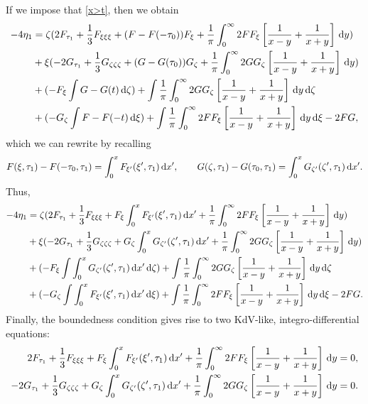 \documentclass[10pt,reqno,oneside,a4paper, landscape]{article}
\begin{document}
If we impose that \eqref{x>t}, then we obtain 
\begin{equation*}
\begin{aligned}
- 4\eta_{1} &=  \zeta(2F_{\tau_1} + \frac{1}{3}F_{\xi\xi\xi} + (F- F(-\tau_0))F_\xi +  \frac{1}{\pi} \int_0^\infty 2FF_\xi \left[ \frac{1}{x-y} + \frac{1}{x+y} \right] \,\mathrm{d} y) \\
&+ \xi(- 2G_{\tau_1} +  \frac{1}{3} G_{\zeta\zeta\zeta}+ (G - G(\tau_0))G_\zeta + \frac{1}{\pi} \int_0^\infty 2GG_\zeta \left[ \frac{1}{x-y} + \frac{1}{x+y} \right] \,\mathrm{d} y) \\
&+ (- F_{\xi} \int G -G(t) \,\mathrm{d} \zeta) + \int \frac{1}{\pi} \int_0^\infty 2GG_\zeta \left[ \frac{1}{x-y} + \frac{1}{x+y} \right] \,\mathrm{d} y \,\mathrm{d} \zeta \\
&+ (-G_{\zeta} \int F - F(-t) \,\mathrm{d} \xi ) +  \int \frac{1}{\pi} \int_0^\infty 2FF_\xi \left[ \frac{1}{x-y} + \frac{1}{x+y} \right] \,\mathrm{d} y \,\mathrm{d} \xi  - 2 FG,
\end{aligned}
\end{equation*}
which we can rewrite by recalling 
\[ 
F(\xi, \tau_1) - F(-\tau_0, \tau_1) = \int^{x}_{0}F_{\xi'}(\xi', \tau_1) \,\mathrm{d} x' , \qquad G(\zeta, \tau_1) - G(\tau_0, \tau_1) = \int^{x}_{0} G_{\zeta'}(\zeta', \tau_1) \,\mathrm{d} x'. 
\]
Thus, 
\begin{equation*}
\begin{aligned}
- 4\eta_{1} &=  \zeta(2F_{\tau_1} + \frac{1}{3}F_{\xi\xi\xi} + F_\xi \int^{x}_{0}F_{\xi'}(\xi', \tau_1) \,\mathrm{d} x' +  \frac{1}{\pi} \int_0^\infty 2FF_\xi \left[ \frac{1}{x-y} + \frac{1}{x+y} \right] \,\mathrm{d} y) \\
&+ \xi(- 2G_{\tau_1} +  \frac{1}{3} G_{\zeta\zeta\zeta}+ G_\zeta \int^{x}_{0} G_{\zeta'}(\zeta', \tau_1) \,\mathrm{d} x' + \frac{1}{\pi} \int_0^\infty 2GG_\zeta \left[ \frac{1}{x-y} + \frac{1}{x+y} \right] \,\mathrm{d} y) \\
&+ (- F_{\xi} \int  \int^{x}_{0} G_{\zeta'}(\zeta', \tau_1) \,\mathrm{d} x'  \,\mathrm{d} \zeta) + \int \frac{1}{\pi} \int_0^\infty 2GG_\zeta \left[ \frac{1}{x-y} + \frac{1}{x+y} \right] \,\mathrm{d} y \,\mathrm{d} \zeta \\
&+ (-G_{\zeta} \int \int^{x}_{0}F_{\xi'}(\xi', \tau_1) \,\mathrm{d} x' \,\mathrm{d} \xi ) +  \int \frac{1}{\pi} \int_0^\infty 2FF_\xi \left[ \frac{1}{x-y} + \frac{1}{x+y} \right] \,\mathrm{d} y \,\mathrm{d} \xi  - 2 FG.
\end{aligned}
\end{equation*}
Finally, the boundedness condition gives rise to two KdV-like, integro-differential equations:
\begin{align*}
2F_{\tau_1} + \frac{1}{3}F_{\xi\xi\xi} + F_\xi \int^{x}_{0}F_{\xi'}(\xi', \tau_1) \,\mathrm{d} x' +  \frac{1}{\pi} \int_0^\infty 2FF_\xi \left[ \frac{1}{x-y} + \frac{1}{x+y} \right] \,\mathrm{d} y &= 0, \\
- 2G_{\tau_1} +  \frac{1}{3} G_{\zeta\zeta\zeta}+ G_\zeta \int^{x}_{0} G_{\zeta'}(\zeta', \tau_1) \,\mathrm{d} x' + \frac{1}{\pi} \int_0^\infty 2GG_\zeta \left[ \frac{1}{x-y} + \frac{1}{x+y} \right] \,\mathrm{d} y &= 0.
\end{align*}
{\small}
\end{document}
